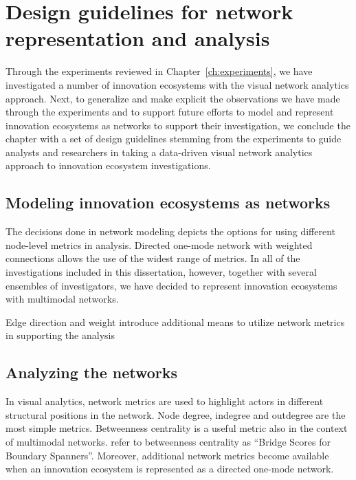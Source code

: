 \section{Design guidelines for network representation and analysis}
\label{sec:designguidelines}

Through the experiments reviewed in Chapter~\ref{ch:experiments}, we have investigated a number of innovation ecosystems with the visual network analytics approach. Next, to generalize and make explicit the observations we have made through the experiments and to support future efforts to model and represent innovation ecosystems as networks to support their investigation, we conclude the chapter with a set of design guidelines stemming from the experiments to guide analysts and researchers in taking a data-driven visual network analytics approach to innovation ecosystem investigations.

\subsection{Modeling innovation ecosystems as networks}
The decisions done in network modeling depicts the options for using different node-level metrics in analysis. Directed one-mode network with weighted connections allows the use of the widest range of metrics. In all of the investigations included in this dissertation, however, together with several ensembles of investigators, we have decided to represent innovation ecosystems with multimodal networks.




 {Edge direction and weight introduce additional means to utilize network metrics in supporting the analysis}

\subsection{Analyzing the networks}

In visual analytics, network metrics are used to highlight actors in different structural positions in the network. Node degree, indegree and outdegree are the most simple metrics. Betweenness centrality is a useful metric also in the context of multimodal networks. \cite{Hansen2011AnalyzingWorld} refer to betweenness centrality as ``Bridge Scores for Boundary Spanners''. Moreover, additional network metrics become available when an innovation ecosystem is represented as a directed one-mode network. 

